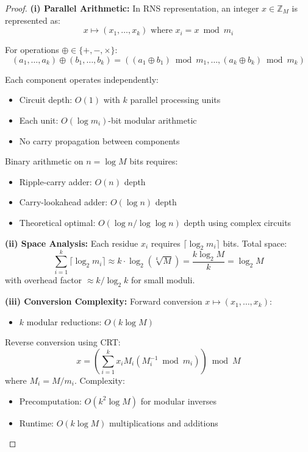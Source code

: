 \documentclass[11pt]{article}
\theoremstyle{definition}
\begin{document}
\begin{proof}
\textbf{(i) Parallel Arithmetic:} In RNS representation, an integer $x \in \mathbb{Z}_M$ is represented as:
\begin{equation}
x \mapsto (x_1, \ldots, x_k) \text{ where } x_i = x \bmod m_i
\end{equation}

For operations $\oplus \in \{+, -, \times\}$:
\begin{equation}
(a_1, \ldots, a_k) \oplus (b_1, \ldots, b_k) = ((a_1 \oplus b_1) \bmod m_1, \ldots, (a_k \oplus b_k) \bmod m_k)
\end{equation}

Each component operates independently:
\begin{itemize}
\item Circuit depth: $O(1)$ with $k$ parallel processing units
\item Each unit: $O(\log m_i)$-bit modular arithmetic
\item No carry propagation between components
\end{itemize}

Binary arithmetic on $n = \log M$ bits requires:
\begin{itemize}
\item Ripple-carry adder: $O(n)$ depth
\item Carry-lookahead adder: $O(\log n)$ depth \cite{koren2002computer}
\item Theoretical optimal: $O(\log n / \log \log n)$ depth using complex circuits
\end{itemize}

\textbf{(ii) Space Analysis:} Each residue $x_i$ requires $\lceil \log_2 m_i \rceil$ bits. Total space:
\begin{equation}
\sum_{i=1}^k \lceil \log_2 m_i \rceil \approx k \cdot \log_2\left(\sqrt[k]{M}\right) = \frac{k \log_2 M}{k} = \log_2 M
\end{equation}
with overhead factor $\approx k / \log_2 k$ for small moduli.

\textbf{(iii) Conversion Complexity:} Forward conversion $x \mapsto (x_1, \ldots, x_k)$:
\begin{itemize}
\item $k$ modular reductions: $O(k \log M)$
\end{itemize}

Reverse conversion using CRT:
\begin{equation}
x = \left(\sum_{i=1}^k x_i M_i (M_i^{-1} \bmod m_i)\right) \bmod M
\end{equation}
where $M_i = M/m_i$. Complexity:
\begin{itemize}
\item Precomputation: $O(k^2 \log M)$ for modular inverses
\item Runtime: $O(k \log M)$ multiplications and additions
\end{itemize}


\end{proof}
\end{document}
